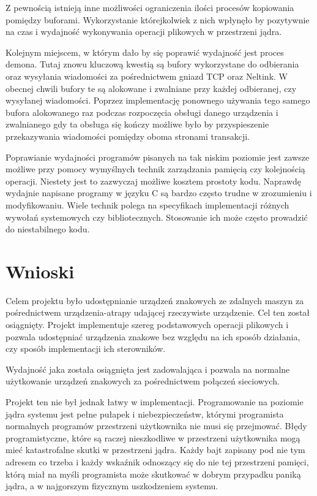 \documentclass[11pt]{scrartcl}
\let\stdsection\section
\renewcommand\section{\newpage\stdsection}
\begin{document}
Z pewnością istnieją inne możliwości ograniczenia ilości procesów kopiowania pomiędzy buforami. Wykorzystanie którejkolwiek z nich wpłynęło by pozytywnie na czas i wydajność wykonywania operacji plikowych w przestrzeni jądra.

Kolejnym miejscem, w którym dało by się poprawić wydajność jest proces demona. Tutaj znowu kluczową kwestią są bufory wykorzystane do odbierania oraz wysyłania wiadomości za pośrednictwem gniazd TCP oraz Neltink. W obecnej chwili bufory te są alokowane i zwalniane przy każdej odbieranej, czy wysyłanej wiadomości. Poprzez implementację ponownego używania tego samego bufora alokowanego raz podczas rozpoczęcia obsługi danego urządzenia i zwalnianego gdy ta obsługa się kończy możliwe było by przyspieszenie przekazywania wiadomości pomiędzy oboma stronami transakcji.

Poprawianie wydajności programów pisanych na tak niskim poziomie jest zawsze możliwe przy pomocy wymyślnych technik zarządzania pamięcią czy kolejnością operacji. Niestety jest to zazwyczaj możliwe kosztem prostoty kodu. Naprawdę wydajnie napisane programy w języku C są bardzo często trudne w zrozumieniu i modyfikowaniu. Wiele technik polega na specyfikach implementacji różnych wywołań systemowych czy bibliotecznych. Stosowanie ich może często prowadzić do niestabilnego kodu.

\section{Wnioski}

Celem projektu było udostępnianie urządzeń znakowych ze zdalnych maszyn za pośrednictwem urządzenia-atrapy udającej rzeczywiste urządzenie. Cel ten został osiągnięty. Projekt implementuje szereg podstawowych operacji plikowych i pozwala udostępniać urządzenia znakowe bez względu na ich sposób działania, czy sposób implementacji ich sterowników.

Wydajność jaka została osiągnięta jest zadowalająca i pozwala na normalne użytkowanie urządzeń znakowych za pośrednictwem połączeń sieciowych.

Projekt ten nie był jednak łatwy w implementacji. Programowanie na poziomie jądra systemu jest pełne pułapek i niebezpieczeństw, którymi programista normalnych programów przestrzeni użytkownika nie musi się przejmować. Błędy programistyczne, które są raczej nieszkodliwe w przestrzeni użytkownika mogą mieć katastrofalne skutki w przestrzeni jądra. Każdy bajt zapisany pod nie tym adresem co trzeba i każdy wskaźnik odnoszący się do nie tej przestrzeni pamięci, którą miał na myśli programista może skutkować w dobrym przypadku paniką jądra, a w najgorszym fizycznym uszkodzeniem systemu.
\end{document}
